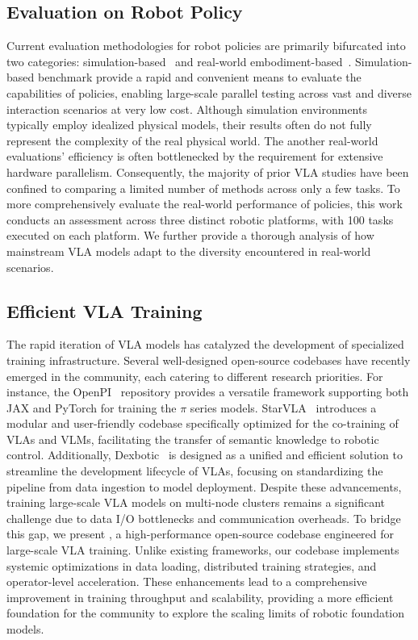 \subsection{Evaluation on Robot Policy}
Current evaluation methodologies for robot policies are primarily bifurcated into two categories: simulation-based~\cite{libero, calvin, simplerenv, robocasa, robotwin2} and real-world embodiment-based~\cite{robochallenge, roboarena}.
Simulation-based benchmark provide a rapid and convenient means to evaluate the capabilities of policies, enabling large-scale parallel testing across vast and diverse interaction scenarios at very low cost. 
Although simulation environments typically employ idealized physical models, their results often do not fully represent the complexity of the real physical world.
The another real-world evaluations' efficiency is often bottlenecked by the requirement for extensive hardware parallelism. 
Consequently, the majority of prior VLA studies have been confined to comparing a limited number of methods across only a few tasks. 
To more comprehensively evaluate the real-world performance of policies, this work conducts an assessment across three distinct robotic platforms, with 100 tasks executed on each platform. We further provide a thorough analysis of how mainstream VLA models adapt to the diversity encountered in real-world scenarios.


\subsection{Efficient VLA Training}
The rapid iteration of VLA models has catalyzed the development of specialized training infrastructure. Several well-designed open-source codebases have recently emerged in the community, each catering to different research priorities. 
For instance, the OpenPI~\cite{pi_0} repository provides a versatile framework supporting both JAX and PyTorch for training the $\pi$ series models. 
StarVLA~\cite{starvla} introduces a modular and user-friendly codebase specifically optimized for the co-training of VLAs and VLMs, facilitating the transfer of semantic knowledge to robotic control. 
Additionally, Dexbotic~\cite{dexbotic} is designed as a unified and efficient solution to streamline the development lifecycle of VLAs, focusing on standardizing the pipeline from data ingestion to model deployment.
Despite these advancements, training large-scale VLA models on multi-node clusters remains a significant challenge due to data I/O bottlenecks and communication overheads.
To bridge this gap, we present \method, a high-performance open-source codebase engineered for large-scale VLA training. Unlike existing frameworks, our codebase implements systemic optimizations in data loading, distributed training strategies, and operator-level acceleration. 
These enhancements lead to a comprehensive improvement in training throughput and scalability, providing a more efficient foundation for the community to explore the scaling limits of robotic foundation models.




